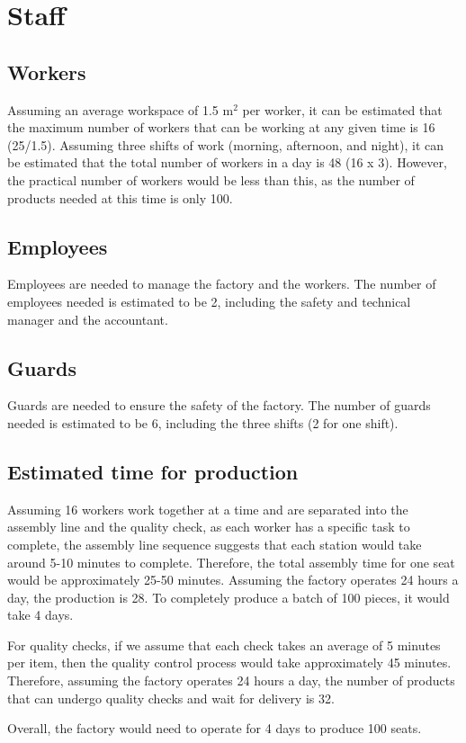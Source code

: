 \section{Staff} \label{sec:Staff}

\subsection{Workers}
Assuming an average workspace of 1.5 $\mathrm{m^2}$ per worker, it can be estimated that the maximum number of workers that can be working at any given time is 16 (25/1.5). Assuming three shifts of work (morning, afternoon, and night), it can be estimated that the total number of workers in a day is 48 (16 x 3). However, the practical number of workers would be less than this, as the number of products needed at this time is only 100.

\subsection{Employees}
Employees are needed to manage the factory and the workers. The number of employees needed is estimated to be 2, including the safety and technical manager and the accountant.

\subsection{Guards}
Guards are needed to ensure the safety of the factory. The number of guards needed is estimated to be 6, including the three shifts (2 for one shift).

\subsection{Estimated time for production }
Assuming 16 workers work together at a time and are separated into the assembly line and the quality check, as each worker has a specific task to complete, the assembly line sequence suggests that each station would take around 5-10 minutes to complete. Therefore, the total assembly time for one seat would be approximately 25-50 minutes. Assuming the factory operates 24 hours a day, the production is 28. To completely produce a batch of 100 pieces, it would take 4 days.

For quality checks, if we assume that each check takes an average of 5 minutes per item, then the quality control process would take approximately 45 minutes. Therefore, assuming the factory operates 24 hours a day, the number of products that can undergo quality checks and wait for delivery is 32. 

Overall, the factory would need to operate for 4 days to produce 100 seats.